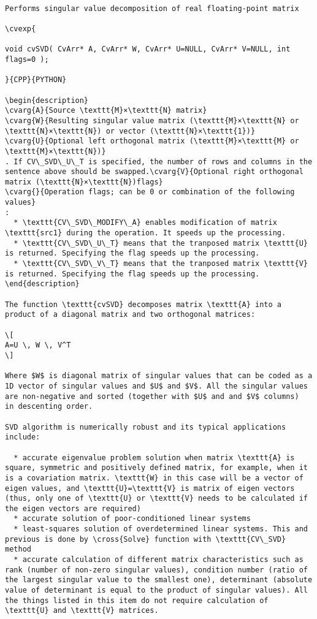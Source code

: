 \begin{verbatim}

Performs singular value decomposition of real floating-point matrix

\cvexp{

void cvSVD( CvArr* A, CvArr* W, CvArr* U=NULL, CvArr* V=NULL, int flags=0 );

}{CPP}{PYTHON}

\begin{description}
\cvarg{A}{Source \texttt{M}×\texttt{N} matrix}
\cvarg{W}{Resulting singular value matrix (\texttt{M}×\texttt{N} or \texttt{N}×\texttt{N}) or vector (\texttt{N}×\texttt{1})}
\cvarg{U}{Optional left orthogonal matrix (\texttt{M}×\texttt{M} or \texttt{M}×\texttt{N})}
. If CV\_SVD\_U\_T is specified, the number of rows and columns in the sentence above should be swapped.\cvarg{V}{Optional right orthogonal matrix (\texttt{N}×\texttt{N})flags}
\cvarg{}{Operation flags; can be 0 or combination of the following values}
:
  * \texttt{CV\_SVD\_MODIFY\_A} enables modification of matrix \texttt{src1} during the operation. It speeds up the processing.
  * \texttt{CV\_SVD\_U\_T} means that the tranposed matrix \texttt{U} is returned. Specifying the flag speeds up the processing.
  * \texttt{CV\_SVD\_V\_T} means that the tranposed matrix \texttt{V} is returned. Specifying the flag speeds up the processing.
\end{description}

The function \texttt{cvSVD} decomposes matrix \texttt{A} into a product of a diagonal matrix and two orthogonal matrices:

\[
A=U \, W \, V^T
\]

Where $W$ is diagonal matrix of singular values that can be coded as a
1D vector of singular values and $U$ and $V$. All the singular values
are non-negative and sorted (together with $U$ and and $V$ columns)
in descenting order.

SVD algorithm is numerically robust and its typical applications include:

  * accurate eigenvalue problem solution when matrix \texttt{A} is square, symmetric and positively defined matrix, for example, when it is a covariation matrix. \texttt{W} in this case will be a vector of eigen values, and \texttt{U}=\texttt{V} is matrix of eigen vectors (thus, only one of \texttt{U} or \texttt{V} needs to be calculated if the eigen vectors are required)
  * accurate solution of poor-conditioned linear systems
  * least-squares solution of overdetermined linear systems. This and previous is done by \cross{Solve} function with \texttt{CV\_SVD} method
  * accurate calculation of different matrix characteristics such as rank (number of non-zero singular values), condition number (ratio of the largest singular value to the smallest one), determinant (absolute value of determinant is equal to the product of singular values). All the things listed in this item do not require calculation of \texttt{U} and \texttt{V} matrices.


\end{verbatim}

